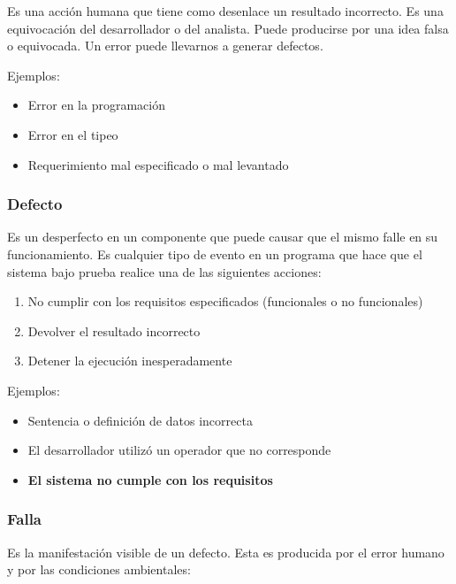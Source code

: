     Es una acción humana que tiene como desenlace un resultado incorrecto. Es una equivocación del desarrollador o del analista. Puede producirse por una idea falsa o equivocada. Un error puede llevarnos a generar defectos.
    
    Ejemplos:
    
    \begin{itemize}
        \item Error en la programación
        \item Error en el tipeo
        \item Requerimiento mal especificado o mal levantado
    \end{itemize}
    
    \subsubsection*{Defecto}

    Es un desperfecto en un componente que puede causar que el mismo falle en su funcionamiento. Es cualquier tipo de evento en un programa que hace que el sistema bajo prueba realice una de las siguientes acciones:
    
    \begin{enumerate}
        \item No cumplir con los requisitos especificados (funcionales o no funcionales)
        \item Devolver el resultado incorrecto
        \item Detener la ejecución inesperadamente
    \end{enumerate}
    
    Ejemplos:
    
    \begin{itemize}
        \item Sentencia o definición de datos incorrecta
        \item El desarrollador utilizó un operador que no corresponde
        \item \textbf{El sistema no cumple con los requisitos}
    \end{itemize}
    
    \subsubsection*{Falla}

    Es la manifestación visible de un defecto. Esta es producida por el error humano y por las condiciones ambientales:
    

